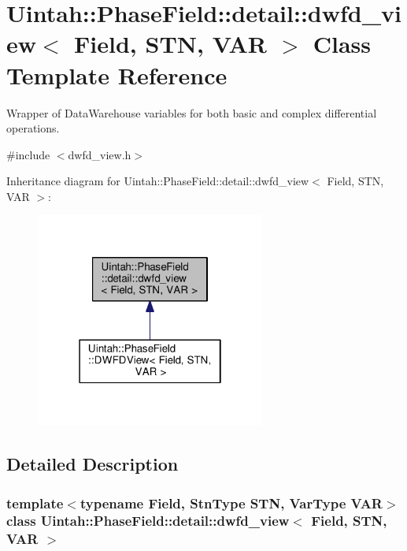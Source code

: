 \hypertarget{classUintah_1_1PhaseField_1_1detail_1_1dwfd__view}{}\section{Uintah\+:\+:Phase\+Field\+:\+:detail\+:\+:dwfd\+\_\+view$<$ Field, S\+TN, V\+AR $>$ Class Template Reference}
\label{classUintah_1_1PhaseField_1_1detail_1_1dwfd__view}


Wrapper of Data\+Warehouse variables for both basic and complex differential operations.  




{\ttfamily \#include $<$dwfd\+\_\+view.\+h$>$}



Inheritance diagram for Uintah\+:\+:Phase\+Field\+:\+:detail\+:\+:dwfd\+\_\+view$<$ Field, S\+TN, V\+AR $>$\+:\nopagebreak
\begin{figure}[H]
\begin{center}
\leavevmode
\includegraphics[width=214pt]{classUintah_1_1PhaseField_1_1detail_1_1dwfd__view__inherit__graph}
\end{center}
\end{figure}


\subsection{Detailed Description}
\subsubsection*{template$<$typename Field, Stn\+Type S\+TN, Var\+Type V\+AR$>$\newline
class Uintah\+::\+Phase\+Field\+::detail\+::dwfd\+\_\+view$<$ Field, S\+T\+N, V\+A\+R $>$}


